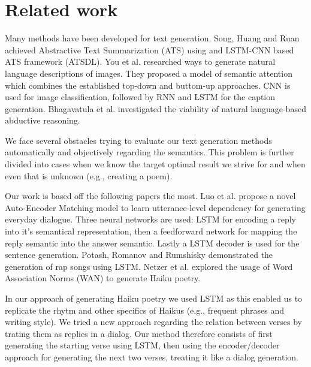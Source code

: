 \documentclass{acm_proc_article-sp}
\begin{document}
\section{Related work}

Many methods have been developed for text generation. Song, Huang and Ruan \cite{song2019abstractive} achieved Abstractive Text Summarization (ATS) using and LSTM-CNN based ATS framework (ATSDL). You et al. \cite{You_2016_CVPR} researched ways to generate natural language descriptions of images. They proposed a model of semantic attention which combines the established top-down and buttom-up approaches. CNN is used for image classification, followed by RNN and LSTM for the caption generation. Bhagavatula et al. \cite{bhagavatula2020abductive} investigated the viability of natural language-based abductive reasoning.

We face several obstacles trying to evaluate our text generation methods automatically and objectively regarding the semantics. This problem is further divided into cases when we know the target optimal result we strive for \cite{papineni2002bleu}\cite{banerjee2005meteor} and when even that is unknown (e.g., creating a poem). \cite{zhang2014chinese}\cite{netzer2009gaiku}

Our work is based off the following papers the most. Luo et al. \cite{luo2018autoencoder} propose a novel Auto-Encoder Matching model to learn utterance-level dependency for generating everyday dialogue. Three neural networks are used: LSTM for encoding a reply into it's semantical representation, then a feedforward network for mapping the reply semantic into the answer semantic. Lastly a LSTM decoder is used for the sentence generation. Potash, Romanov and Rumshisky \cite{potash2015ghostwriter} demonstrated the generation of rap songs using LSTM. Netzer et al. \cite{netzer2009gaiku} explored the usage of Word Association Norms (WAN) to generate Haiku poetry.

In our approach of generating Haiku poetry we used LSTM as this enabled us to replicate the rhytm and other specifics of Haikus (e.g., frequent phrases and writing style). \cite{potash2015ghostwriter} We tried a new approach regarding the relation between verses by trating them as replies in a dialog. Our method therefore consists of first generating the starting verse using LSTM, then using the encoder/decoder approach for generating the next two verses, treating it like a dialog generation.
\end{document}
